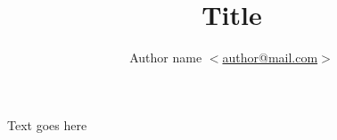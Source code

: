 \documentclass[11pt,a4paper]{article}
\author{Author name $<$\href{mailto:author@mail.com}{author@mail.com}$>$}
\title{Title}
\begin{document}
	\maketitle
	
	Text goes here
	
	\pagebreak
	
	
\end{document}
